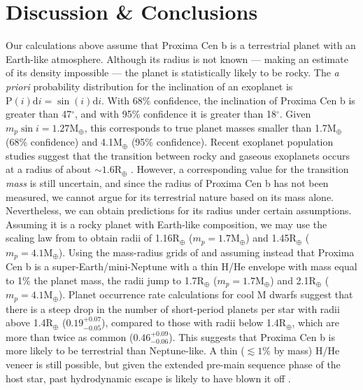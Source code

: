 \documentclass{emulateapj}
\begin{document}
\section{Discussion \& Conclusions}
\label{sec:disc}
Our calculations above assume that Proxima Cen b is a terrestrial planet with an Earth-like atmosphere. Although its radius is not known --- making an estimate of its density impossible --- the planet is statistically likely to be rocky. The \emph{a priori} probability distribution for the inclination of an exoplanet is $\mathrm{P}(i)\mathrm{d}i = \sin(i)\mathrm{d}i$. With 68\% confidence, the inclination of Proxima Cen b is greater than 47$^\circ$, and with 95\% confidence it is greater than 18$^\circ$. Given $m_p\sin i = 1.27\mathrm{M}_\oplus$, this corresponds to true planet masses smaller than 1.7M$_\oplus$ (68\% confidence) and 4.1M$_\oplus$ (95\% confidence). Recent exoplanet population studies suggest that the transition between rocky and gaseous exoplanets occurs at a radius of about ${\sim}1.6\mathrm{R}_\oplus$ \citep{Rogers2015, Wolfgang2015}. However, a corresponding value for the transition \emph{mass} is still uncertain, and since the radius of Proxima Cen b has not been measured, we cannot argue for its terrestrial nature based on its mass alone. Nevertheless, we can obtain predictions for its radius under certain assumptions. Assuming it is a rocky planet with Earth-like composition, we may use the scaling law from \citet{Fortney2007} to obtain radii of 1.16R$_\oplus$ ($m_p = 1.7\mathrm{M}_\oplus$) and 1.45R$_\oplus$ ($m_p = 4.1\mathrm{M}_\oplus$).
Using the mass-radius grids of \citet{Lopez2012} and assuming instead that Proxima Cen b is a super-Earth/mini-Neptune with a thin H/He envelope with mass equal to 1\% the planet mass, the radii jump to 1.7R$_\oplus$ ($m_p = 1.7\mathrm{M}_\oplus$) and 2.1R$_\oplus$ ($m_p = 4.1\mathrm{M}_\oplus$).
Planet occurrence rate calculations for cool M dwarfs \citep{Dressing2013} suggest that there is a steep drop in the number of short-period planets per star with radii above 1.4R$_\oplus$ ($0.19^{+0.07}_{-0.05}$), compared to those with radii below 1.4R$_\oplus$, which are more than twice as common ($0.46^{+0.09}_{-0.06}$). This suggests that Proxima Cen b is more likely to be terrestrial than Neptune-like. A thin ($\lesssim 1\%$ by mass) H/He veneer is still possible, but given the extended pre-main sequence phase of the host star, past hydrodynamic escape is likely to have blown it off \citep{Luger2015, Barnes2016}.
\end{document}

